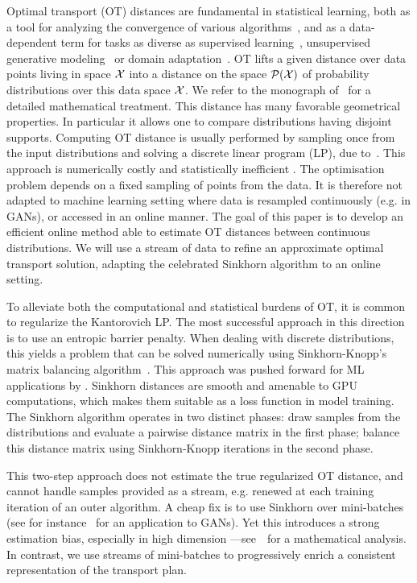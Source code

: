
Optimal transport (OT) distances are fundamental in statistical learning, both
as a tool for analyzing the convergence of various
algorithms~\citep{canas2012learning,dalalyan2019user}, and as a data-dependent
term for tasks as diverse as supervised learning~\citep{frogner2015learning},
unsupervised generative modeling~\citep{arjovsky2017wgan} or domain
adaptation~\citep{courty2016optimal}.
%
OT lifts a given distance over data points living in space $\mathcal{X}$ into a distance
on the space $\mathcal{P}(\mathcal{X})$ of probability distributions over this data space $\mathcal{X}$. We refer to the monograph of~\citet{santambrogio2015optimal} for a detailed mathematical treatment.
%
This distance has many favorable geometrical properties. In particular it allows one to compare distributions having disjoint supports. 
% 
Computing OT distance is usually performed by sampling once from the input
distributions and solving a discrete linear program (LP), due
to~\citet{Kantorovich42}. This approach is numerically costly and statistically
inefficient \citep{weed2019sharp}. The optimisation problem depends on a fixed
sampling of points from the data. It is therefore not adapted to machine
learning setting where data is resampled continuously (e.g. in GANs), or
accessed in an online manner. The goal of this paper is to develop an efficient
online method able to estimate OT distances between continuous distributions. We
will use a stream of data to refine an approximate optimal transport solution,
adapting the celebrated Sinkhorn algorithm to an online setting.
  


To alleviate both the computational and statistical burdens of OT, it is common
to regularize the Kantorovich LP.
%
The most successful approach in this direction is to use an entropic barrier penalty. 
%
When dealing with discrete distributions, this yields a problem that can be solved
numerically using Sinkhorn-Knopp's matrix balancing
algorithm~\citep{Sinkhorn64,sinkhorn1967concerning}.
%
This approach was pushed forward for ML applications by
\citet{cuturi2013sinkhorn}. Sinkhorn distances are smooth and amenable to GPU
computations, which makes them suitable as a loss function in model training.
The Sinkhorn algorithm operates in two distinct phases: draw samples from the
distributions and evaluate a pairwise distance matrix in the first phase;
balance this distance matrix using Sinkhorn-Knopp iterations in the second
phase.

This two-step approach does not estimate the true regularized OT
distance, and cannot handle samples provided as a stream, e.g. renewed at each
training iteration of an outer algorithm. A cheap fix is to use Sinkhorn over
mini-batches (see for instance~\citet{2018-Genevay-aistats} for an application
to GANs). Yet this introduces a strong estimation bias, especially in high
dimension ---see~\citet{fatras2019learning} for a mathematical analysis. In
contrast, we use streams of mini-batches to progressively enrich a consistent representation of the
transport plan.

